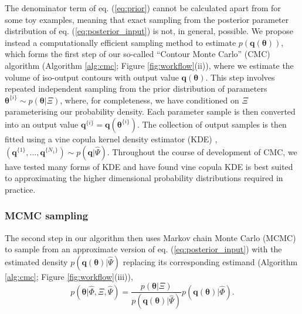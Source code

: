 The denominator term of eq. (\ref{eq:prior}) cannot be calculated apart from for some toy examples, meaning that exact sampling from the posterior parameter distribution of eq. (\ref{eq:posterior_input}) is not, in general, possible. We propose instead a computationally efficient sampling method to estimate $p(\boldsymbol{q}(\boldsymbol{\theta}))$, which forms the first step of our so-called ``Contour Monte Carlo'' (CMC) algorithm (Algorithm \ref{alg:cmc}; Figure \ref{fig:workflow}(ii)), where we estimate the volume of iso-output contours with output value $\boldsymbol{q}(\boldsymbol{\theta})$. This step involves repeated independent sampling from the prior distribution of parameters $\boldsymbol{\theta}^{\{i\}}\sim p(\boldsymbol{\theta}|\Xi)$, where, for completeness, we have conditioned on $\Xi$ parameterising our probability density. Each parameter sample is then converted into an output value $\boldsymbol{q}^{\{i\}}=\boldsymbol{q}(\boldsymbol{\theta}^{\{i\}})$. The collection of output samples is then fitted using a vine copula kernel density estimator (KDE) \cite{nagler2016evading}, $(\boldsymbol{q}^{\{1\}},...,\boldsymbol{q}^{\{N_1\}})\sim p({\boldsymbol{q}}|\hat{\Psi})$. Throughout the course of development of CMC, we have tested many forms of KDE and have found vine copula KDE is best suited to approximating the higher dimensional probability distributions required in practice.


\subsubsection{MCMC sampling}

The second step in our algorithm then uses Markov chain Monte Carlo (MCMC) to sample from an approximate version of eq. (\ref{eq:posterior_input}) with the estimated density $p(\boldsymbol{q}(\boldsymbol{\theta})|\hat{\Psi})$ replacing its corresponding estimand (Algorithm \ref{alg:cmc}; Figure \ref{fig:workflow}(iii)),
%
\begin{equation}\label{eq:posterior_input_estimated}
p(\boldsymbol{\theta}|\hat{\Phi},\Xi,\hat{\Psi}) =
\frac{p(\boldsymbol{\theta}|\Xi)}{p(\boldsymbol{q}(\boldsymbol{\theta})|\hat{\Psi})}
p(\boldsymbol{q}(\boldsymbol{\theta})|\hat{\Phi}).
\end{equation}
%

